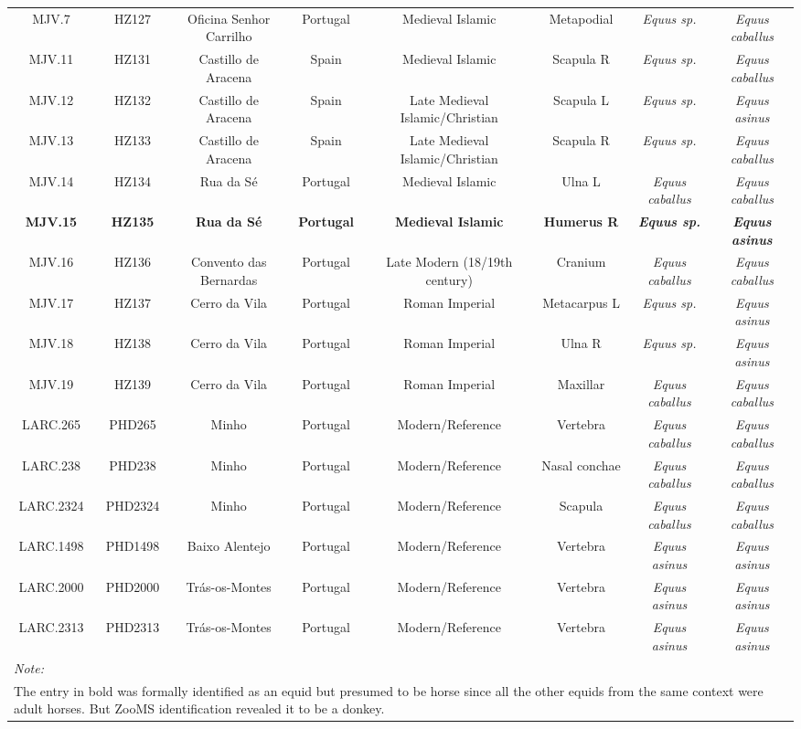 \documentclass[
]{article}
\begin{document}
\begin{landscape}
\begin{table}
\begin{tabular}[t]{cccccc>{}c>{}c}
MJV.7 & HZ127 & Oficina Senhor Carrilho & Portugal & Medieval Islamic & Metapodial & \em{Equus {\normalfont sp.}} & \em{Equus caballus}\\
MJV.11 & HZ131 & Castillo de Aracena & Spain & Medieval Islamic & Scapula R & \em{Equus {\normalfont sp.}} & \em{Equus caballus}\\
MJV.12 & HZ132 & Castillo de Aracena & Spain & Late Medieval Islamic/Christian & Scapula L & \em{Equus {\normalfont sp.}} & \em{Equus asinus}\\
MJV.13 & HZ133 & Castillo de Aracena & Spain & Late Medieval Islamic/Christian & Scapula R & \em{Equus {\normalfont sp.}} & \em{Equus caballus}\\
MJV.14 & HZ134 & Rua da S\'{e} & Portugal & Medieval Islamic & Ulna L & \em{Equus caballus} & \em{Equus caballus}\\
\textbf{MJV.15} & \textbf{HZ135} & \textbf{Rua da S\'{e}} & \textbf{Portugal} & \textbf{Medieval Islamic} & \textbf{Humerus R} & \textbf{\em{Equus {\normalfont sp.}}} & \textbf{\em{Equus asinus}}\\
MJV.16 & HZ136 & Convento das Bernardas & Portugal & Late Modern (18/19th century) & Cranium & \em{Equus caballus} & \em{Equus caballus}\\
MJV.17 & HZ137 & Cerro da Vila & Portugal & Roman Imperial & Metacarpus L & \em{Equus {\normalfont sp.}} & \em{Equus asinus}\\
MJV.18 & HZ138 & Cerro da Vila & Portugal & Roman Imperial & Ulna R & \em{Equus {\normalfont sp.}} & \em{Equus asinus}\\
MJV.19 & HZ139 & Cerro da Vila & Portugal & Roman Imperial & Maxillar & \em{Equus caballus} & \em{Equus caballus}\\
LARC.265 & PHD265 & Minho & Portugal & Modern/Reference & Vertebra & \em{Equus caballus} & \em{Equus caballus}\\
LARC.238 & PHD238 & Minho & Portugal & Modern/Reference & Nasal conchae & \em{Equus caballus} & \em{Equus caballus}\\
LARC.2324 & PHD2324 & Minho & Portugal & Modern/Reference & Scapula & \em{Equus caballus} & \em{Equus caballus}\\
LARC.1498 & PHD1498 & Baixo Alentejo & Portugal & Modern/Reference & Vertebra & \em{Equus asinus} & \em{Equus asinus}\\
LARC.2000 & PHD2000 & Tr\'{a}s-os-Montes & Portugal & Modern/Reference & Vertebra & \em{Equus asinus} & \em{Equus asinus}\\
LARC.2313 & PHD2313 & Tr\'{a}s-os-Montes & Portugal & Modern/Reference & Vertebra & \em{Equus asinus} & \em{Equus asinus}\\
\bottomrule
\multicolumn{8}{l}{\rule{0pt}{1em}\textit{Note: }}\\
\multicolumn{8}{l}{\rule{0pt}{1em}The entry in bold was formally identified as an equid but presumed to be horse since all the other equids from the same context were adult horses. But ZooMS identification revealed it to be a donkey.}\\
\end{tabular}
\end{table}
\end{landscape}
\end{document}

